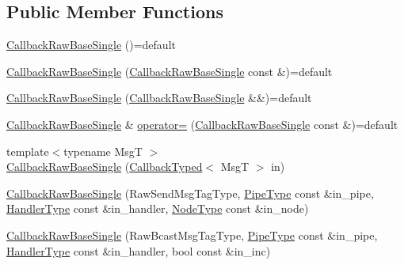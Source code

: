 \subsection*{Public Member Functions}
\begin{DoxyCompactItemize}
\item 
\hyperlink{structvt_1_1pipe_1_1callback_1_1cbunion_1_1_callback_raw_base_single_a54c1e88b04174314284479d39f31c46a}{Callback\+Raw\+Base\+Single} ()=default
\item 
\hyperlink{structvt_1_1pipe_1_1callback_1_1cbunion_1_1_callback_raw_base_single_a80569ca80e358052d839a15a0bcd287c}{Callback\+Raw\+Base\+Single} (\hyperlink{structvt_1_1pipe_1_1callback_1_1cbunion_1_1_callback_raw_base_single}{Callback\+Raw\+Base\+Single} const \&)=default
\item 
\hyperlink{structvt_1_1pipe_1_1callback_1_1cbunion_1_1_callback_raw_base_single_a8b2961b281dbf416f6d2eec2b7c11192}{Callback\+Raw\+Base\+Single} (\hyperlink{structvt_1_1pipe_1_1callback_1_1cbunion_1_1_callback_raw_base_single}{Callback\+Raw\+Base\+Single} \&\&)=default
\item 
\hyperlink{structvt_1_1pipe_1_1callback_1_1cbunion_1_1_callback_raw_base_single}{Callback\+Raw\+Base\+Single} \& \hyperlink{structvt_1_1pipe_1_1callback_1_1cbunion_1_1_callback_raw_base_single_a7037c612d471371061a32dc7b1bdea3a}{operator=} (\hyperlink{structvt_1_1pipe_1_1callback_1_1cbunion_1_1_callback_raw_base_single}{Callback\+Raw\+Base\+Single} const \&)=default
\item 
{\footnotesize template$<$typename MsgT $>$ }\\\hyperlink{structvt_1_1pipe_1_1callback_1_1cbunion_1_1_callback_raw_base_single_a00a840a889e6ca98c250d3f663972ade}{Callback\+Raw\+Base\+Single} (\hyperlink{structvt_1_1pipe_1_1callback_1_1cbunion_1_1_callback_typed}{Callback\+Typed}$<$ MsgT $>$ in)
\item 
\hyperlink{structvt_1_1pipe_1_1callback_1_1cbunion_1_1_callback_raw_base_single_a76de7a82f36dcd8dee39036df2e3d0ba}{Callback\+Raw\+Base\+Single} (Raw\+Send\+Msg\+Tag\+Type, \hyperlink{namespacevt_ac9852acda74d1896f48f406cd72c7bd3}{Pipe\+Type} const \&in\+\_\+pipe, \hyperlink{namespacevt_af64846b57dfcaf104da3ef6967917573}{Handler\+Type} const \&in\+\_\+handler, \hyperlink{namespacevt_a866da9d0efc19c0a1ce79e9e492f47e2}{Node\+Type} const \&in\+\_\+node)
\item 
\hyperlink{structvt_1_1pipe_1_1callback_1_1cbunion_1_1_callback_raw_base_single_a7ebe746790c6faff50578af79dc1726e}{Callback\+Raw\+Base\+Single} (Raw\+Bcast\+Msg\+Tag\+Type, \hyperlink{namespacevt_ac9852acda74d1896f48f406cd72c7bd3}{Pipe\+Type} const \&in\+\_\+pipe, \hyperlink{namespacevt_af64846b57dfcaf104da3ef6967917573}{Handler\+Type} const \&in\+\_\+handler, bool const \&in\+\_\+inc)

\end{DoxyCompactItemize}
